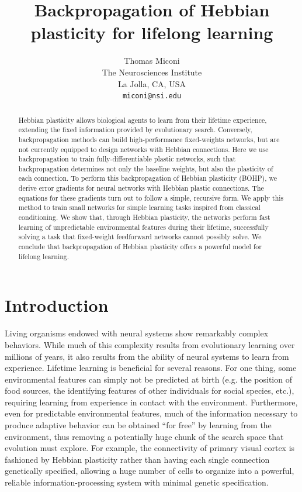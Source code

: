 \documentclass{article}
\title{Backpropagation of Hebbian plasticity for lifelong learning}
\author{
    Thomas Miconi\\
    The Neurosciences Institute\\
    La Jolla, CA, USA\\
    \texttt{miconi@nsi.edu}
}
\begin{document}
\maketitle

\begin{abstract}
Hebbian plasticity allows biological agents to learn from their lifetime
experience, extending the fixed information provided by evolutionary search.
Conversely, backpropagation methods can build high-performance fixed-weights
networks, but are not currently equipped to design networks with Hebbian
connections. Here we use backpropagation to train fully-differentiable plastic networks, such that
backpropagation determines not only the baseline weights, but also the
plasticity of each connection. To perform this backpropagation of Hebbian
plasticity (BOHP), we derive error gradients for neural networks with Hebbian
plastic connections. The equations for these gradients turn out to follow a
simple, recursive form. We apply this method to train small networks for simple
learning tasks inspired from classical conditioning. We show that, through
Hebbian plasticity, the networks perform fast learning of
unpredictable environmental features during their lifetime, successfully solving
a task that fixed-weight feedforward networks cannot possibly solve. We conclude that
backpropagation of Hebbian plasticity offers a powerful model for lifelong
learning.
\end{abstract}


\section{Introduction}

Living organisms endowed with neural systems show remarkably complex behaviors.
While much of this complexity results from evolutionary learning over millions
of years, it also results from the ability of neural systems to learn from
experience. Lifetime learning is beneficial for several reasons. For one thing,
some environmental features can simply not be predicted at birth (e.g. the
position of food sources, the identifying features of other individuals for
social species, etc.), requiring learning from experience in contact with the
environment. Furthermore, even for predictable environmental features, much of
the information necessary to produce adaptive behavior can be obtained ``for
free'' by learning from the environment, thus removing a potentially huge chunk
of the search space that evolution must explore. For example, the connectivity
of primary visual cortex is fashioned by Hebbian plasticity rather than having
each single connection genetically specified, allowing a huge number of cells
to organize into a powerful, reliable information-processing system with
minimal genetic specification.
\end{document}

